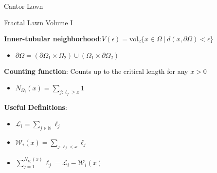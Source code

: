 \documentclass{if-beamer}
\newcommand{\N}{\mathbb{N}}
\newcommand{\SL}{\mathcal{L}}
\newcommand{\W}{\mathcal{W}}
\newcommand{\Om}{\Omega}
\begin{document}
\begin{frame}{Cantor Lawn}
	\begin{center}
	\end{center}
\end{frame}

\begin{frame}{Fractal Lawn Volume I}

{\bf Inner-tubular neighborhood}:\quad $V(\epsilon) = \text{vol}_2\{x \in \Om\ |\ d(x,\partial\Om) < \epsilon\}$
\pause 
\begin{itemize}
	\item $\partial\Om=(\partial\Om_1\times\Om_2)\cup(\Om_1\times\partial\Om_2)$
\end{itemize}
\pause
\vspace{.2in}

{\bf Counting function}: Counts up to the critical length for any $x > 0$
\pause
\begin{itemize}
	\item $\displaystyle N_{\Omega_i}(x) = \sum_{j: \ell_j \geq x}1$
\end{itemize}
\pause
\vspace{.2in}

{\bf Useful Definitions}:
\pause
\begin{itemize}
	\item $\displaystyle \SL_i=\sum_{j \in \N }\ell_j$
	\pause
	\item $\displaystyle \W_i(x)=\sum_{j: \ell_j < x}\ell_j$
	\pause
	\item $\displaystyle \sum_{j = 1}^{N_{\Om_i}(x)}\ell_j=\SL_i - \W_i(x)$
\end{itemize}


\end{frame}
\end{document}
